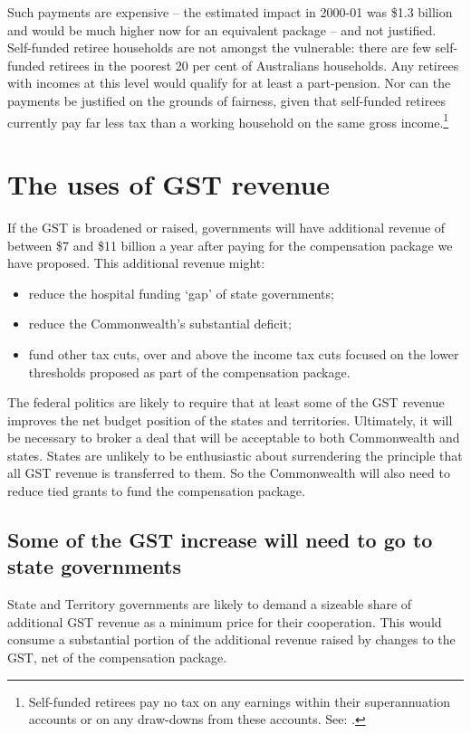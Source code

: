 Such payments are expensive – the estimated impact in 2000-01 was \$1.3 billion and would be much higher now for an equivalent package – and not justified. Self-funded retiree households are not amongst the vulnerable: there are few self-funded retirees in the poorest 20 per cent of Australians households. Any retirees with incomes at this level would qualify for at least a part-pension. Nor can the payments be justified on the grounds of fairness, given that self-funded retirees currently pay far less tax than a working household on the same gross income.\footnote{Self-funded retirees pay no tax on any earnings within their superannuation accounts or on any draw-downs from these accounts. See: .}  

\chapter{The uses of GST revenue}\label{chapter:GST-4}
If the GST is broadened or raised, governments will have additional revenue of between \$7 and \$11 billion a year after paying for the compensation package we have proposed. This additional revenue might:
\begin{itemize}
\item	reduce the hospital funding ‘gap’ of state governments;
\item 	reduce the Commonwealth’s substantial deficit; 
\item 	fund other tax cuts, over and above the income tax cuts focused on the lower thresholds proposed as part of the compensation package. 
\end{itemize}
The federal politics are likely to require that at least some of the GST revenue improves the net budget position of the states and territories. Ultimately, it will be necessary to broker a deal that will be acceptable to both Commonwealth and states. States are unlikely to be enthusiastic about surrendering the principle that all GST revenue is transferred to them. So the Commonwealth will also need to reduce tied grants to fund the compensation package. 

\section{Some of the GST increase will need to go to state governments}\label{sec:4-1}
State and Territory governments are likely to demand a sizeable share of additional GST revenue as a minimum price for their cooperation. This would consume a substantial portion of the additional revenue raised by changes to the GST, net of the compensation package.


